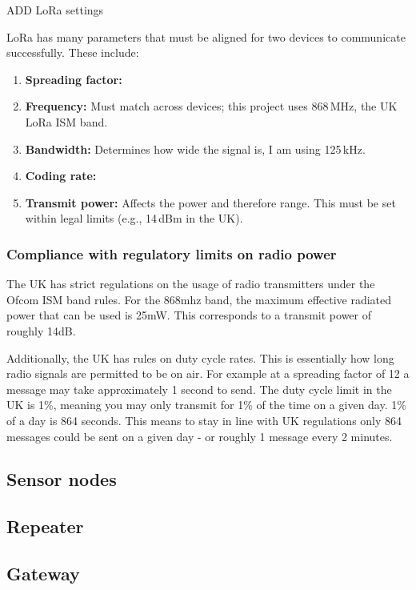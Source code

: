   {ADD LoRa settings}

LoRa has many parameters that must be aligned for two devices to communicate
successfully. These include:

\begin{enumerate}
  \item \textbf{Spreading factor:}
  \item \textbf{Frequency:} Must match across devices; this project uses
        868\,MHz, the UK LoRa ISM band.
  \item \textbf{Bandwidth:} Determines how wide the signal is, I am using
        125\,kHz.
  \item \textbf{Coding rate:}
  \item \textbf{Transmit power:} Affects the power and therefore range. This
        must be set within legal limits (e.g., 14\,dBm in the UK).
\end{enumerate}

\subsubsection{Compliance with regulatory limits on radio power}

The UK has strict regulations on the usage of radio transmitters under the Ofcom
ISM band rules. For the 868mhz band, the maximum effective radiated power that
can be used is 25mW. This corresponds to a transmit power of roughly 14dB.

Additionally, the UK has rules on duty cycle rates. This is essentially how long
radio signals are permitted to be on air. For example at a spreading factor of
12 a message may take approximately 1 second to send. The duty cycle limit in
the UK is 1\%, meaning you may only transmit for 1\% of the time on a given day.
1\% of a day is 864 seconds. This means to stay in line with UK regulations only
864 messages could be sent on a given day - or roughly 1 message every 2
minutes.


\subsection{Sensor nodes}

\subsection{Repeater}

\subsection{Gateway}

